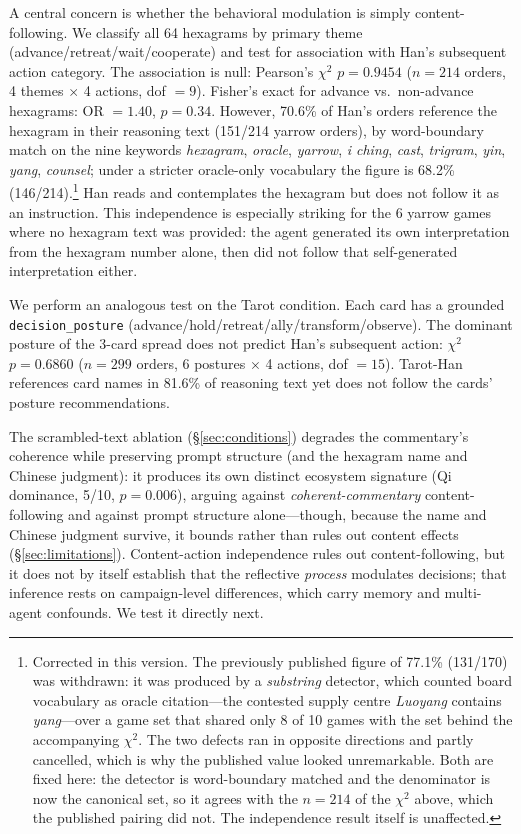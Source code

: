 \documentclass[11pt]{article}
\begin{document}
A central concern is whether the behavioral modulation is simply content-following. We classify all 64 hexagrams by primary theme (advance/retreat/wait/cooperate) and test for association with Han's subsequent action category. The association is null: Pearson's $\chi^2$ $p = 0.9454$ ($n = 214$ orders, 4 themes $\times$ 4 actions, dof $= 9$). Fisher's exact for advance vs.\ non-advance hexagrams: OR $= 1.40$, $p = 0.34$. However, 70.6\% of Han's orders reference the hexagram in their reasoning text (151/214 yarrow orders), by word-boundary match on the nine keywords \emph{hexagram}, \emph{oracle}, \emph{yarrow}, \emph{i ching}, \emph{cast}, \emph{trigram}, \emph{yin}, \emph{yang}, \emph{counsel}; under a stricter oracle-only vocabulary the figure is 68.2\% (146/214).\footnote{Corrected in this version. The previously published figure of 77.1\% (131/170) was withdrawn: it was produced by a \emph{substring} detector, which counted board vocabulary as oracle citation---the contested supply centre \emph{Luoyang} contains \emph{yang}---over a game set that shared only 8 of 10 games with the set behind the accompanying $\chi^2$. The two defects ran in opposite directions and partly cancelled, which is why the published value looked unremarkable. Both are fixed here: the detector is word-boundary matched and the denominator is now the canonical set, so it agrees with the $n = 214$ of the $\chi^2$ above, which the published pairing did not. The independence result itself is unaffected.} Han reads and contemplates the hexagram but does not follow it as an instruction. This independence is especially striking for the 6 yarrow games where no hexagram text was provided: the agent generated its own interpretation from the hexagram number alone, then did not follow that self-generated interpretation either.

We perform an analogous test on the Tarot condition. Each card has a grounded \texttt{decision\_posture} (advance/hold/retreat/ally/transform/observe). The dominant posture of the 3-card spread does not predict Han's subsequent action: $\chi^2$ $p = 0.6860$ ($n = 299$ orders, 6 postures $\times$ 4 actions, dof $= 15$). Tarot-Han references card names in 81.6\% of reasoning text yet does not follow the cards' posture recommendations.

The scrambled-text ablation (\S\ref{sec:conditions}) degrades the commentary's coherence while preserving prompt structure (and the hexagram name and Chinese judgment): it produces its own distinct ecosystem signature (Qi dominance, 5/10, $p = 0.006$), arguing against \emph{coherent-commentary} content-following and against prompt structure alone---though, because the name and Chinese judgment survive, it bounds rather than rules out content effects (\S\ref{sec:limitations}). Content-action independence rules out content-following, but it does not by itself establish that the reflective \emph{process} modulates decisions; that inference rests on campaign-level differences, which carry memory and multi-agent confounds. We test it directly next.
\end{document}
